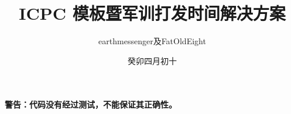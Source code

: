 \documentclass{article}
\title{ICPC 模板暨军训打发时间解决方案}
\author{earthmessenger及FatOldEight}
\date{癸卯四月初十}
\begin{document}
\maketitle

\clearpage

\textbf{警告：代码没有经过测试，不能保证其正确性。}

\tableofcontents


\end{document}
